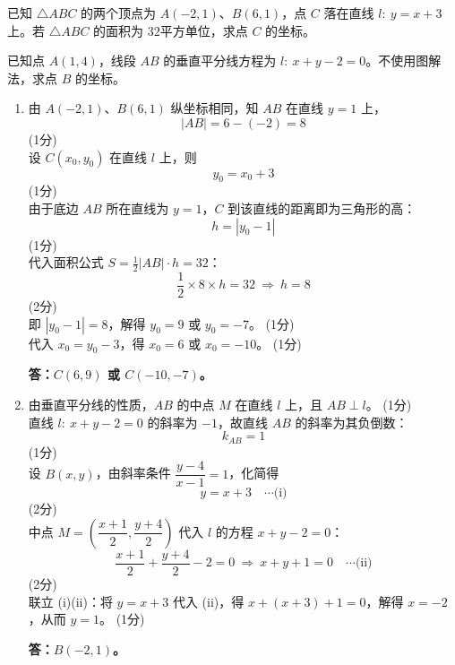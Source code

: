 \documentclass[12pt,a4paper]{exam-zh}
\newcommand{\qscore}[1]{%
    \unskip\nobreak\hfill
    \makebox[0pt][l]{\makebox[4em][r]{(#1\%)}}%
}
\begin{document}
\begin{question}[points = 14]

    \begin{questionparts}
        \item 已知 $\triangle ABC$ 的两个顶点为 $A(-2,1)$、$B(6,1)$，点 $C$ 落在直线 $l:\ y = x + 3$ 上。若 $\triangle ABC$ 的面积为 $32$平方单位，求点 $C$ 的坐标。
        \qscore{5}

        \item 已知点 $A(1,4)$，线段 $AB$ 的垂直平分线方程为 $l:\ x + y - 2 = 0$。不使用图解法，求点 $B$ 的坐标。 \qscore{5}
    \end{questionparts}
\end{question}

\begin{solution}
    \begin{enumerate}[label=(\alph*)]
        \item 由 $A(-2,1)$、$B(6,1)$ 纵坐标相同，知 $AB$ 在直线 $y=1$ 上，
        \[ \displaystyle |AB| = 6-(-2) = 8 \] \hfill (1分) \\
        设 $C(x_0,y_0)$ 在直线 $l$ 上，则
        \[ \displaystyle y_0 = x_0 + 3 \] \hfill (1分) \\
        由于底边 $AB$ 所在直线为 $y=1$，$C$ 到该直线的距离即为三角形的高：
        \[ \displaystyle h = |y_0 - 1| \] \hfill (1分) \\
        代入面积公式 $\displaystyle S = \frac{1}{2}|AB|\cdot h = 32$：
        \[ \displaystyle \frac{1}{2}\times 8 \times h = 32 \ \Longrightarrow\ h = 8 \] \hfill (2分) \\
        即 $|y_0-1| = 8$，解得 $y_0 = 9$ 或 $y_0 = -7$。 \hfill (1分) \\
        代入 $x_0 = y_0 - 3$，得 $x_0 = 6$ 或 $x_0 = -10$。 \hfill (1分)

        \textbf{答：$C(6,9)$ 或 $C(-10,-7)$。}

        \item 由垂直平分线的性质，$AB$ 的中点 $M$ 在直线 $l$ 上，且 $AB \perp l$。 \hfill (1分) \\
        直线 $l:\ x+y-2=0$ 的斜率为 $-1$，故直线 $AB$ 的斜率为其负倒数：
        \[ \displaystyle k_{AB} = 1 \] \hfill (1分) \\
        设 $B(x,y)$，由斜率条件 $\dfrac{y-4}{x-1}=1$，化简得
        \[ \displaystyle y = x + 3 \quad \cdots\text{(i)} \] \hfill (2分) \\
        中点 $M = \left(\dfrac{x+1}{2}, \dfrac{y+4}{2}\right)$ 代入 $l$ 的方程 $x+y-2=0$：
        \[ \displaystyle \frac{x+1}{2} + \frac{y+4}{2} - 2 = 0 \ \Longrightarrow\ x + y + 1 = 0 \quad \cdots\text{(ii)} \] \hfill (2分) \\
        联立 (i)(ii)：将 $y=x+3$ 代入 (ii)，得 $x+(x+3)+1=0$，解得 $x=-2$，从而 $y=1$。 \hfill (1分)

        \textbf{答：$B(-2,1)$。}
    \end{enumerate}
\end{solution}
\end{document}
